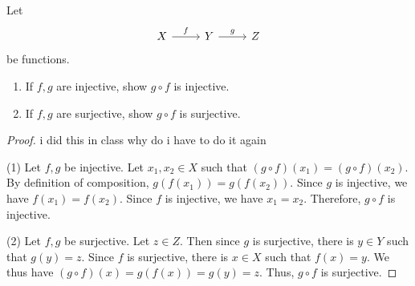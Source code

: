 \documentclass[11pt, letterpaper]{article}
\begin{document}
\begin{problem}[Exercise 3.3.5]\label{prob:4}
	Let
	\[
		\begin{tikzcd}[row sep = 2.5em, column sep = 2.5em]
		X \ar[" f ", r]  & Y \ar[" g ", r]  & Z
	\end{tikzcd}
	\]
	be functions.
	\begin{enumerate}[label=(\arabic*)]
		\item If $f,g$ are injective, show $g\circ f$ is injective.
		\item If $f,g$ are surjective, show $g\circ f$ is surjective.
	\end{enumerate}
\end{problem}
\begin{proof}
	i did this in class why do i have to do it again

	(1) Let $f,g$ be injective. Let $x_1,x_2\in X$ such that $(g\circ f)(x_1)=(g\circ f)(x_2)$. By definition of composition, $g(f(x_1))=g(f(x_2))$. Since $g$ is injective, we have $f(x_1)=f(x_2)$. Since $f$ is injective, we have $x_1=x_2$. Therefore, $g\circ f$ is injective.

	(2) Let $f,g$ be surjective. Let $z\in Z$. Then since $g$ is surjective, there is $y\in Y$ such that $g(y)=z$. Since $f$ is surjective, there is $x\in X$ such that $f(x)=y$. We thus have $(g\circ f)(x) = g(f(x)) = g(y)=z$. Thus, $g\circ f$ is surjective.
\end{proof}
\end{document}

